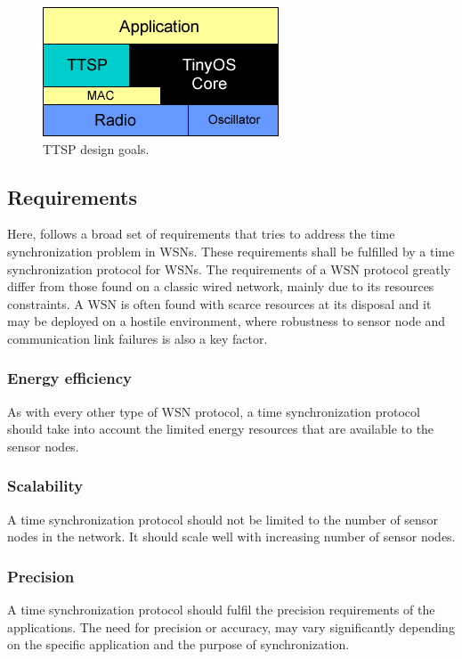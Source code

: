 \begin{figure}[!htb]
\begin{center}
\includegraphics[scale=0.7]{./images/02-ttsp-hwsf_arch.png}
\end{center}
\caption{TTSP design goals.}
\label{designgoals}
\end{figure}

\subsection{Requirements}
Here, follows a broad set of requirements that tries to address the time synchronization problem in WSNs. These requirements shall be fulfilled by a time synchronization protocol for WSNs. The requirements of a WSN protocol greatly differ from those found on a classic wired network, mainly due to its resources constraints. A WSN is often found with scarce resources at its disposal and it may be deployed on a hostile environment, where robustness to sensor node and communication link failures is also a key factor.

\subsubsection{Energy efficiency}
As with every other type of WSN protocol, a time synchronization protocol should take into account the limited energy resources that are available to the sensor nodes.

\subsubsection{Scalability}
A time synchronization protocol should not be limited to the  number of sensor nodes in the network. It should scale well with increasing number of sensor nodes.

\subsubsection{Precision}
A time synchronization protocol should fulfil the precision requirements of the applications. The need for precision or accuracy, may vary significantly depending on the specific application and the purpose of synchronization.


